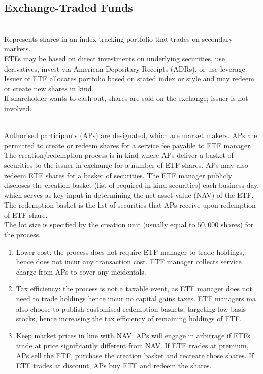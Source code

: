 \subsection{Exchange-Traded Funds}

\begin{definition} \\
Represents shares in an index-tracking portfolio that trades on secondary markets.\\
ETFs may be based on direct investments on underlying securities, use derivatives, invest via American Depositary Receipts (ADRs), or use leverage. Issuer of ETF allocates portfolio based on stated index or style and may redeem or create new shares in kind.\\
If shareholder wants to cash out, shares are sold on the exchange; issuer is not involved.
\end{definition}

\begin{remark} \\
Authorised participants (APs) are designated, which are market makers. APs are permitted to create or redeem shares for a service fee payable to ETF manager. The creation/redemption process is in-kind where APs deliver a basket of securities to the issuer in exchange for a number of ETF shares. APs may also redeem ETF shares for a basket of securities. The ETF manager publicly discloses the creation basket (list of required in-kind securities) each business day, which serves as key input in determining the net asset value (NAV) of the ETF. The redemption basket is the list of securities that APs receive upon redemption of ETF share.\\
The lot size is specified by the creation unit (usually equal to $50,000$ shares) for the process.
\end{remark}

\begin{remark} 
\begin{enumerate}[label=\roman*.]
\setlength{\itemsep}{0pt}
\item Lower cost: the process does not require ETF manager to trade holdings, hence does not incur any transaction cost. ETF manager collects service charge from APs to cover any incidentals.
\item Tax efficiency: the process is not a taxable event, as ETF manager does not need to trade holdings hence incur no capital gains taxes. ETF managers ma also choose to publish customised redemption baskets, targeting low-basis stocks, hence increasing the tax efficiency of remaining holdings of ETF.
\item Keep market prices in line with NAV: APs will engage in arbitrage if ETFs trade at price significantly different from NAV. If ETF trades at premium, APs sell the ETF, purchase the creation basket and recreate those shares. If ETF trades at discount, APs buy ETF and redeem the shares.
\end{enumerate}
\end{remark}

